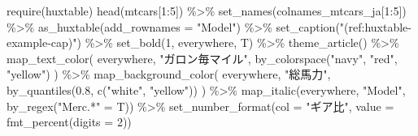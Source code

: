 \documentclass[
  xelatex,ja=standard,jafont=noto]{bxjsbook}
\newenvironment{Shaded}{\begin{snugshade}}{\end{snugshade}}
\newcommand{\AttributeTok}[1]{\textcolor[rgb]{0.77,0.63,0.00}{#1}}
\newcommand{\DecValTok}[1]{\textcolor[rgb]{0.00,0.00,0.81}{#1}}
\newcommand{\FloatTok}[1]{\textcolor[rgb]{0.00,0.00,0.81}{#1}}
\newcommand{\FunctionTok}[1]{\textcolor[rgb]{0.00,0.00,0.00}{#1}}
\newcommand{\NormalTok}[1]{#1}
\newcommand{\OtherTok}[1]{\textcolor[rgb]{0.56,0.35,0.01}{#1}}
\newcommand{\SpecialCharTok}[1]{\textcolor[rgb]{0.00,0.00,0.00}{#1}}
\newcommand{\StringTok}[1]{\textcolor[rgb]{0.31,0.60,0.02}{#1}}
\theoremstyle{definition}
\theoremstyle{definition}
\theoremstyle{definition}
\theoremstyle{definition}
\theoremstyle{remark}
\begin{document}
\begin{Shaded}
\begin{Highlighting}[numbers=left,,]
\FunctionTok{require}\NormalTok{(huxtable)}
\FunctionTok{head}\NormalTok{(mtcars[}\DecValTok{1}\SpecialCharTok{:}\DecValTok{5}\NormalTok{]) }\SpecialCharTok{\%\textgreater{}\%}
  \FunctionTok{set\_names}\NormalTok{(colnames\_mtcars\_ja[}\DecValTok{1}\SpecialCharTok{:}\DecValTok{5}\NormalTok{]) }\SpecialCharTok{\%\textgreater{}\%}
  \FunctionTok{as\_huxtable}\NormalTok{(}\AttributeTok{add\_rownames =} \StringTok{"Model"}\NormalTok{) }\SpecialCharTok{\%\textgreater{}\%}
  \FunctionTok{set\_caption}\NormalTok{(}\StringTok{"(ref:huxtable{-}example{-}cap)"}\NormalTok{) }\SpecialCharTok{\%\textgreater{}\%}
  \FunctionTok{set\_bold}\NormalTok{(}\DecValTok{1}\NormalTok{, everywhere, T) }\SpecialCharTok{\%\textgreater{}\%}
  \FunctionTok{theme\_article}\NormalTok{() }\SpecialCharTok{\%\textgreater{}\%}
  \FunctionTok{map\_text\_color}\NormalTok{(}
\NormalTok{    everywhere, }\StringTok{"ガロン毎マイル"}\NormalTok{, }\FunctionTok{by\_colorspace}\NormalTok{(}\StringTok{"navy"}\NormalTok{, }\StringTok{"red"}\NormalTok{, }\StringTok{"yellow"}\NormalTok{)}
\NormalTok{  ) }\SpecialCharTok{\%\textgreater{}\%}
  \FunctionTok{map\_background\_color}\NormalTok{(}
\NormalTok{    everywhere, }\StringTok{"総馬力"}\NormalTok{, }\FunctionTok{by\_quantiles}\NormalTok{(}\FloatTok{0.8}\NormalTok{, }\FunctionTok{c}\NormalTok{(}\StringTok{"white"}\NormalTok{, }\StringTok{"yellow"}\NormalTok{))}
\NormalTok{  ) }\SpecialCharTok{\%\textgreater{}\%}
  \FunctionTok{map\_italic}\NormalTok{(everywhere, }\StringTok{"Model"}\NormalTok{, }\FunctionTok{by\_regex}\NormalTok{(}\StringTok{"Merc.*"} \OtherTok{=}\NormalTok{ T)) }\SpecialCharTok{\%\textgreater{}\%}
  \FunctionTok{set\_number\_format}\NormalTok{(}\AttributeTok{col =} \StringTok{"ギア比"}\NormalTok{, }\AttributeTok{value =} \FunctionTok{fmt\_percent}\NormalTok{(}\AttributeTok{digits =} \DecValTok{2}\NormalTok{))}
\end{Highlighting}
\end{Shaded}

 
  \providecommand{\huxb}[2]{\arrayrulecolor[RGB]{#1}\global\arrayrulewidth=#2pt}
  \providecommand{\huxvb}[2]{\color[RGB]{#1}\vrule width #2pt}
  \providecommand{\huxtpad}[1]{\rule{0pt}{#1}}
  \providecommand{\huxbpad}[1]{\rule[-#1]{0pt}{#1}}
\end{document}
